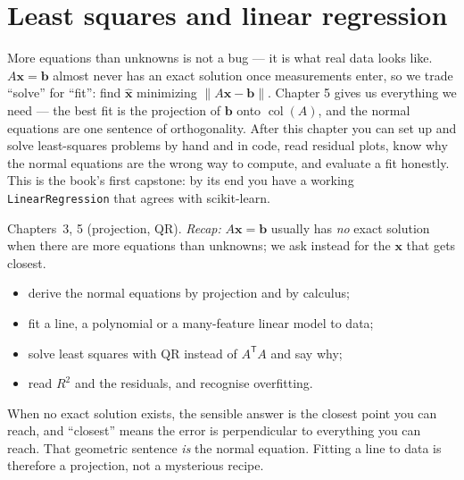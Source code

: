 \chapter{Least squares and linear regression}\label{ch:lstsq}

More equations than unknowns is not a bug --- it is what real data looks
like. $A\mathbf x=\mathbf b$ almost never has an exact solution once
measurements enter, so we trade ``solve'' for ``fit'': find
$\hat{\mathbf x}$ minimizing $\lVert A\mathbf x-\mathbf b\rVert$. Chapter 5
gives us everything we need --- the best fit is the projection of $\mathbf b$
onto $\operatorname{col}(A)$, and the normal equations are one sentence of
orthogonality. After this chapter you can set up and solve least-squares
problems by hand and in code, read residual plots, know why the normal
equations are the wrong way to compute, and evaluate a fit honestly.
This is the book's first capstone: by its end you have a working
\texttt{LinearRegression} that agrees with scikit-learn.

\begin{rulebox}
Chapters~3, 5 (projection, QR). \emph{Recap:} $A\mathbf x=\mathbf b$ usually has \emph{no} exact solution when there are more equations than unknowns; we ask instead for the $\mathbf x$ that gets closest.
\end{rulebox}
\begin{wins}
\begin{itemize}
\item derive the normal equations by projection and by calculus;
\item fit a line, a polynomial or a many-feature linear model to data;
\item solve least squares with QR instead of $A^{\mathsf T}A$ and say why;
\item read $R^2$ and the residuals, and recognise overfitting.
\end{itemize}
\end{wins}
\begin{principle}
When no exact solution exists, the sensible answer is the closest point you can reach, and ``closest'' means the error is perpendicular to everything you can reach. That geometric sentence \emph{is} the normal equation. Fitting a line to data is therefore a projection, not a mysterious recipe.
\end{principle}

